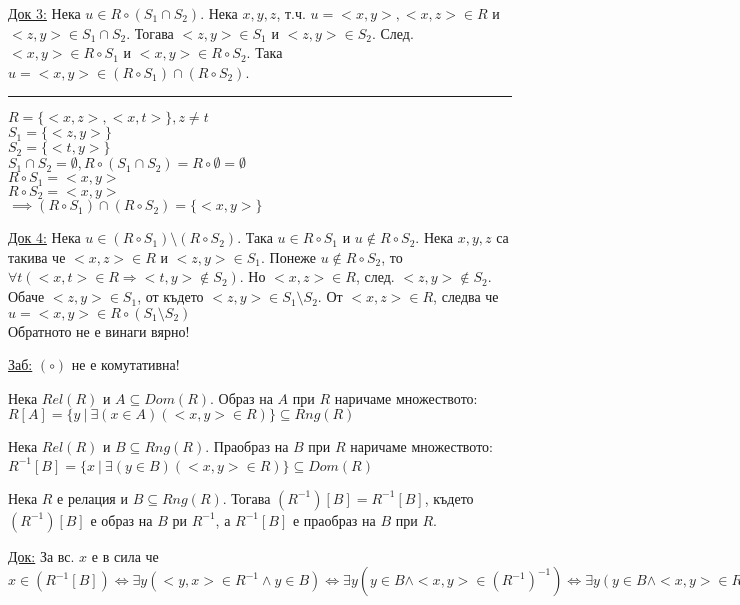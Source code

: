 \documentclass[fleqn, titlepage, 12pt]{report}
\begin{document}
\underline{Док 3:} Нека $u \in R \circ (S_1 \cap S_2)$. Нека $x,y,z$,
т.ч. $u = <x,y>, <x,z> \in R$ и $<z,y> \in S_1 \cap S_2$. Тогава $<z,y> \in S_1$ и $<z,y> \in S_2$.
След. $<x,y> \in R \circ S_1$ и $<x,y> \in R \circ S_2$. Така $u = <x,y> \in (R \circ S_1) \cap (R \circ S_2)$.
\bigbreak
\hrule
\bigbreak
$R = \{ <x,z>, <x,t>\}, z \neq t$\\
$S_1 = \{ <z,y>\}$\\
$S_2 = \{ <t,y>\}$\\
$S_1 \cap S_2 = \emptyset, R \circ (S_1 \cap S_2) = R \circ \emptyset = \emptyset$\\
$R \circ S_1 = {<x,y>}$\\
$R \circ S_2 = {<x,y>}$\\
$\implies (R \circ S_1) \cap (R \circ S_2) = \{ <x,y>\}$
\bigbreak

\underline{Док 4:} Нека $u \in (R \circ S_1) \setminus (R \circ S_2)$. Така $u \in R \circ S_1$ и $u \notin R \circ S_2$.
Нека $x,y,z$ са такива че $<x,z> \in R$ и $<z,y> \in S_1$. Понеже $u \notin R \circ S_2$,
то $\forall{t}(<x,t> \in R \Rightarrow <t,y> \notin S_2)$. Но $<x,z> \in R$, след. $<z,y> \notin S_2$.
Обаче $<z,y> \in S_1$, от където $<z,y> \in S_1 \setminus S_2$. От $<x,z> \in R$,
следва че $u = <x,y> \in R \circ (S_1 \setminus S_2)$\\
Обратното не е винаги вярно!
\bigbreak

\underline{Заб:} $ (\circ) $ не е комутативна!
\bigbreak

 Нека $Rel(R)$ и $A \subseteq Dom(R)$. Образ на $A$ при $R$ наричаме множеството:\\
$R[A] = \{y\ |\ \exists{(x \in A)}(<x,y> \in R)\} \subseteq Rng(R)$
\bigbreak

 Нека $Rel(R)$ и $B \subseteq Rng(R)$. Праобраз на $B$ при $R$ наричаме множеството:\\
$R^{-1}[B ]= \{x\ |\ \exists{(y \in B)}(<x,y> \in R)\} \subseteq Dom(R)$
\bigbreak

 Нека $R$ е релация и $B \subseteq Rng(R)$. Тогава $(R^{-1})[B] = R^{-1}[B] $, където
$(R^{-1})[B]$ е образ на $B$ ри $R^{-1}$, а $R^{-1}[B]$ е праобраз на $B$ при $R$.
\bigbreak

\underline{Док:} За вс. $x$ е в сила че $x \in (R^{-1}[B]) \Longleftrightarrow \exists{y}(<y,x> \in R^{-1} \land y \in B)
\Longleftrightarrow \exists{y}(y \in B \land  <x,y> \in (R^{-1})^{-1})
\Longleftrightarrow \exists{y}(y \in B \land <x,y> \in R) \Longleftrightarrow x \in (R)^{-1}[B]$
\bigbreak
\end{document}
